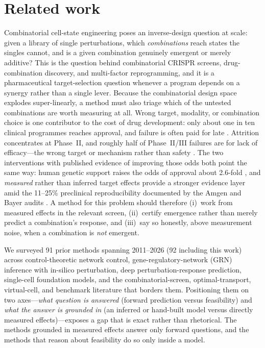 \section{Related work}
\label{sec:related}

Combinatorial cell-state engineering poses an inverse-design question at scale: given a
library of single perturbations, which \emph{combinations} reach states the singles cannot,
and is a given combination genuinely emergent or merely additive? This is the question behind
combinatorial CRISPR screens, drug-combination discovery, and multi-factor reprogramming, and
it is a pharmaceutical target-selection question whenever a program depends on a synergy rather
than a single lever. Because the combinatorial design space explodes super-linearly, a method
must also triage which of the untested combinations are worth measuring at all. Wrong target,
modality, or combination choice is one contributor to the cost of drug development: only about
one in ten clinical programmes reaches approval, and failure is often paid for late
\citep{Minikel2024,WongSiahLo2019}. Attrition concentrates
at Phase~II, and roughly half of Phase~II/III failures are for lack of efficacy---the
wrong target or mechanism rather than safety \citep{Harrison2016}. The two interventions
with published evidence of improving those odds both point the same way: human genetic
support raises the odds of approval about 2.6-fold \citep{Minikel2024,Nelson2015}, and
\emph{measured} rather than inferred target effects provide a stronger evidence layer amid the
11--25\% preclinical reproducibility documented by the Amgen and Bayer audits
\citep{BegleyEllis2012,Prinz2011}. A method for this problem should therefore (i)~work from
measured effects in the relevant screen, (ii)~certify emergence rather than merely
predict a combination's response, and (iii)~say so honestly, above measurement noise, when a
combination is \emph{not} emergent.

We surveyed 91 prior methods spanning 2011--2026 (92 including this work) across
control-theoretic network control,
gene-regulatory-network (GRN) inference with in-silico perturbation, deep
perturbation-response prediction, single-cell foundation models, and the
combinatorial-screen, optimal-transport, virtual-cell, and benchmark literature that
borders them. Positioning them on two axes---\emph{what question is answered} (forward
prediction versus feasibility) and \emph{what the answer is grounded in} (an inferred or
hand-built model versus directly measured effects)---exposes a gap that is exact rather
than rhetorical. The methods grounded in measured effects answer only forward questions,
and the methods that reason about feasibility do so only inside a model.

